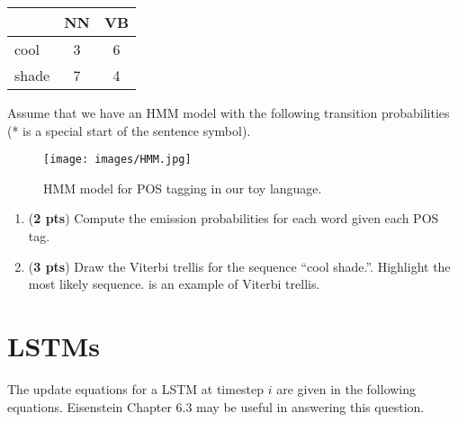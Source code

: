 \documentclass[11pt, letterpaper]{article}
\begin{document}
    \begin{table}[h!]
    \centering
    \small
    \begin{tabular}{|l | c | c |}
    \hline & NN & VB\\
    \hline
    cool & 3 & 6 \\
    shade & 7 & 4\\
    \hline
    \end{tabular}
    \end{table}
    Assume that we have an HMM model with the following transition probabilities (* is a special start of the sentence symbol).
    
    \begin{figure}[h]
    \centering
    \texttt{[image: images/HMM.jpg]}
    \caption{HMM model for POS tagging in our toy language.}
    \end{figure}

\begin{enumerate}[label=(\alph*)]
\item (\textbf{2 pts}) Compute the emission probabilities for each word given each POS tag.\\

\item (\textbf{3 pts}) Draw the Viterbi trellis for the sequence “cool shade.”. Highlight the most likely sequence. \href{https://web.stanford.edu/~jurafsky/slp3/A.pdf#page=8}{\color{blue}{Here}} is an  example of Viterbi trellis.

\end{enumerate}

\newpage

\section{LSTMs}


The update equations for a LSTM at timestep $i$ are given in the following equations. Eisenstein Chapter 6.3 may be useful in answering this question. 
\end{document}
